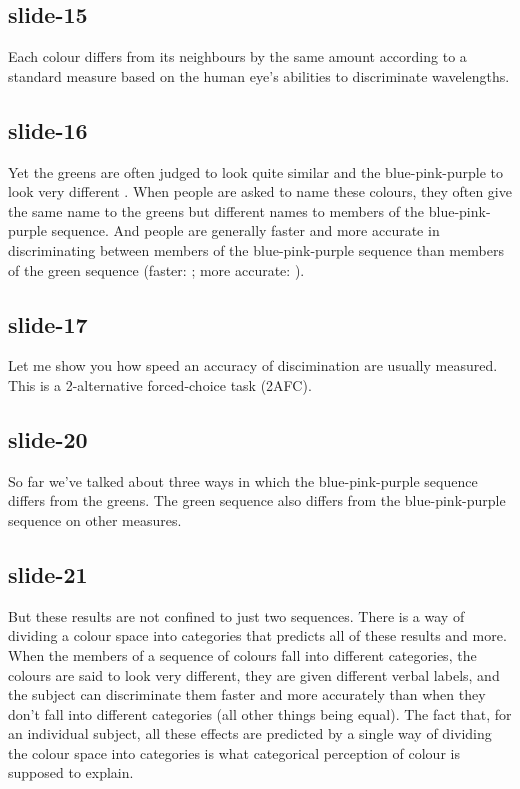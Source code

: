 \documentclass[12pt,\papersize]{extarticle}
\begin{document}
 
\subsection{slide-15}
Each colour differs from its neighbours by the same amount according to a standard measure based on the human eye's abilities to discriminate wavelengths.
 
 
\subsection{slide-16}
Yet the greens are often judged to look quite similar and the blue-pink-purple to look very different \citep[p.\ 12--7]{Roberson:1999rk}.
When people are asked to name these colours, they often give the same name to the greens but different names to members of the blue-pink-purple sequence.
And people are generally faster and more accurate in discriminating between members of the blue-pink-purple sequence than members of the green sequence (faster: \citealp{Bornstein:1984cb}; more accurate: \citealp[p.\ 22--7]{Roberson:1999rk}).
 
 
\subsection{slide-17}
Let me show you how speed an accuracy of discimination are usually measured.
This is a 2-alternative forced-choice task (2AFC).
 
 
\subsection{slide-20}
So far we've talked about three ways in which the blue-pink-purple sequence differs from the greens.
The green sequence also differs from the blue-pink-purple sequence on other measures.
 
 
\subsection{slide-21}
But these results are not confined to just two sequences.
There is a way of dividing a colour space into categories that predicts all of these results and more.
When the members of a sequence of colours fall into different categories, the colours are said to look very different, they are given different verbal labels, and the subject can discriminate them faster and more accurately than when they don't fall into different categories (all other things being equal).
The fact that, for an individual subject, all these effects are predicted by a single way of dividing the colour space into categories is what categorical perception of colour is supposed to explain.
 
\end{document}
